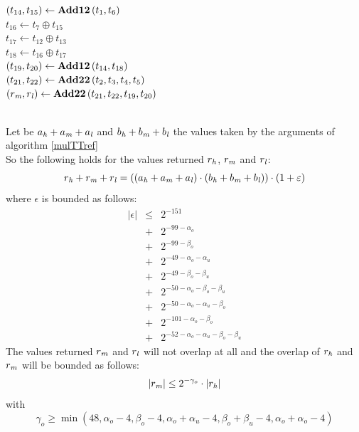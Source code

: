 \begin{algorithm}[\MulTT]
\begin{center}
\begin{minipage}[b]{60mm}
$\left( t_{14}, t_{15} \right) \gets \mathbf{Add12}\left( t_1, t_6 \right)$ \\
$t_{16} \gets t_7 \oplus t_{15}$ \\
$t_{17} \gets t_{12} \oplus t_{13}$ \\
$t_{18} \gets t_{16} \oplus t_{17}$ \\
$\left( t_{19}, t_{20} \right) \gets \mathbf{Add12}\left( t_{14}, t_{18} \right)$ \\
$\left( t_{21}, t_{22} \right) \gets \mathbf{Add22}\left( t_2, t_3, t_4, t_5 \right)$ \\
$\left( r_{\mathit{m}}, r_{\mathit{l}} \right) \gets \mathbf{Add22}\left( t_{21}, t_{22}, t_{19}, t_{20} \right)$ 
\end{minipage}
\end{center}
\end{algorithm}
\begin{theorem} ~ \\
Let be $a_{\mathit{h}} + a_{\mathit{m}} + a_{\mathit{l}}$ and $b_{\mathit{h}} + b_{\mathit{m}} + b_{\mathit{l}}$ the values taken by 
the arguments of algorithm \ref{mulTTref} \MulTT \\
So the following holds for the values returned $r_{\mathit{h}}$, $r_{\mathit{m}}$ and $r_{\mathit{l}}$:
$$r_{\mathit{h}} + r_{\mathit{m}} + r_{\mathit{l}} = 
\left(\left(a_{\mathit{h}} + a_{\mathit{m}} + a_{\mathit{l}} \right) \cdot \left( b_{\mathit{h}} + b_{\mathit{m}} + b_{\mathit{l}} \right)\right) \cdot 
\left(1 + \varepsilon\right)$$
where $\epsilon$ is bounded as follows:
\begin{eqnarray*}
\left \vert \epsilon \right \vert & \leq & 2^{-151} \\
& + & 2^{-99-\alpha_o} \\
& + & 2^{-99-\beta_o} \\
& + & 2^{-49-\alpha_o-\alpha_u} \\
& + & 2^{-49-\beta_o-\beta_u} \\
& + & 2^{-50-\alpha_o-\beta_o-\beta_u} \\
& + & 2^{-50-\alpha_o-\alpha_u-\beta_o} \\
& + & 2^{-101-\alpha_o-\beta_o} \\
& + & 2^{-52-\alpha_o-\alpha_u-\beta_o-\beta_u}
\end{eqnarray*}
The values returned $r_{\mathit{m}}$ and $r_{\mathit{l}}$ will not overlap at all and the overlap of $r_{\mathit{h}}$ and $r_{\mathit{m}}$ will be bounded as
follows:
$$\left \vert r_{\mathit{m}} \right \vert \leq 2^{-\gamma_o} \cdot \left \vert r_{\mathit{h}} \right \vert$$
with
$$\gamma_o \geq \min\left( 48, \alpha_o-4, \beta_o-4,\alpha_o+\alpha_u-4,\beta_o+\beta_u-4,\alpha_o+\alpha_o-4 \right)$$
\end{theorem}



